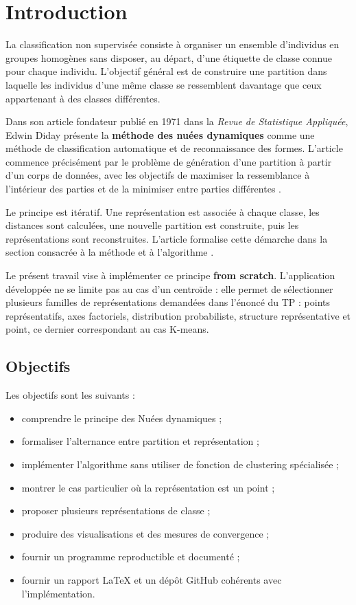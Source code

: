 \documentclass[12pt,a4paper]{article}
\begin{document}
\tableofcontents
\newpage

\section{Introduction}

La classification non supervisée consiste à organiser un ensemble d'individus en groupes homogènes sans disposer, au départ, d'une étiquette de classe connue pour chaque individu. L'objectif général est de construire une partition dans laquelle les individus d'une même classe se ressemblent davantage que ceux appartenant à des classes différentes.

Dans son article fondateur publié en 1971 dans la \textit{Revue de Statistique Appliquée}, Edwin Diday présente la \textbf{méthode des nuées dynamiques} comme une méthode de classification automatique et de reconnaissance des formes. L'article commence précisément par le problème de génération d'une partition à partir d'un corps de données, avec les objectifs de maximiser la ressemblance à l'intérieur des parties et de la minimiser entre parties différentes \cite{diday1971}.

Le principe est itératif. Une représentation est associée à chaque classe, les distances sont calculées, une nouvelle partition est construite, puis les représentations sont reconstruites. L'article formalise cette démarche dans la section consacrée à la méthode et à l'algorithme \cite{diday1971}.

Le présent travail vise à implémenter ce principe \textbf{from scratch}. L'application développée ne se limite pas au cas d'un centroïde : elle permet de sélectionner plusieurs familles de représentations demandées dans l'énoncé du TP : points représentatifs, axes factoriels, distribution probabiliste, structure représentative et point, ce dernier correspondant au cas K-means.

\subsection{Objectifs}

Les objectifs sont les suivants :
\begin{itemize}[leftmargin=1.1cm]
    \item comprendre le principe des Nuées dynamiques ;
    \item formaliser l'alternance entre partition et représentation ;
    \item implémenter l'algorithme sans utiliser de fonction de clustering spécialisée ;
    \item montrer le cas particulier où la représentation est un point ;
    \item proposer plusieurs représentations de classe ;
    \item produire des visualisations et des mesures de convergence ;
    \item fournir un programme reproductible et documenté ;
    \item fournir un rapport LaTeX et un dépôt GitHub cohérents avec l'implémentation.
\end{itemize}
\end{document}
